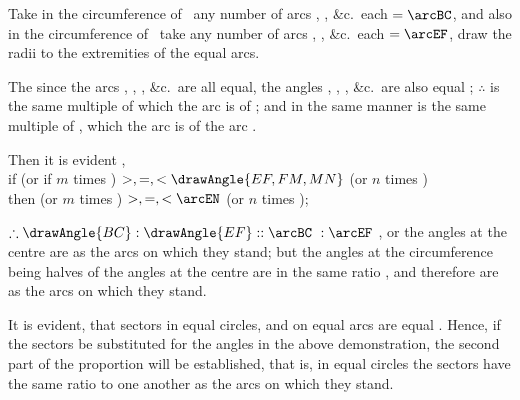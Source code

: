 \documentclass[booklanguage=english]{byrnebook}
\begin{document}
Take in the circumference of \circleG\ any number of arcs
,
, \&c.\ each $= \arcBC$, and also in the circumference of \circleH\ take any number of arcs
,
, \&c.\ each $= \arcEF$, draw the radii to the extremities of the equal arcs.

The since the arcs \arcBC, \arcCK, \arcKL, \&c.\ are all equal, the angles , , , \&c.\ are also equal ; $\therefore$  is the same multiple of  which the arc  is of \arcBC; and in the same manner  is the same multiple of , which the arc  is of the arc \arcEF.

\begin{center}
Then it is evident ,\\
if  (or if $m$ times ) $>, =, < \drawAngle{EF,FM,MN}$ (or $n$ times )\\
then \arcBL (or $m$ times \arcBC) $>, =, < \arcEN$ (or $n$ times \arcEF);
\end{center}

$\therefore \drawAngle{BC} : \drawAngle{EF} :: \arcBC\ : \arcEF$ , or the angles at the centre are as the arcs on which they stand; but the angles at the circumference being halves of the angles at the centre  are in the same ratio , and therefore are as the arcs on which they stand.

It is evident, that sectors in equal circles, and on equal arcs are equal . Hence, if the sectors be substituted for the angles in the above demonstration, the second part of the proportion will be established, that is, in equal circles the sectors have the same ratio to one another as the arcs on which they stand.
\end{document}
